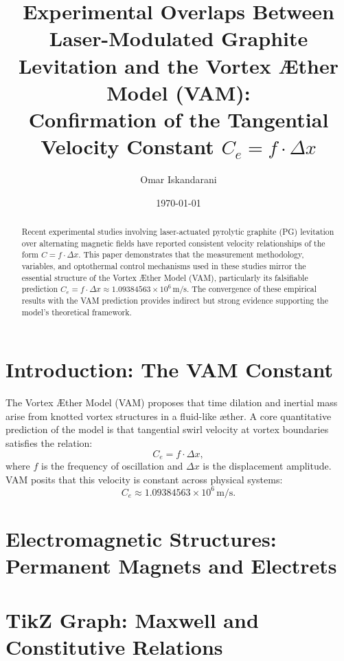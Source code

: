 \documentclass[11pt]{article}
\title{Experimental Overlaps Between Laser-Modulated Graphite Levitation and the Vortex Æther Model (VAM):\\
Confirmation of the Tangential Velocity Constant \( C_e = f \cdot \Delta x \)}
\author{Omar Iskandarani}
\date{\today}
\begin{document}
\maketitle

\begin{abstract}
Recent experimental studies involving laser-actuated pyrolytic graphite (PG) levitation over alternating magnetic fields have reported consistent velocity relationships of the form \( C = f \cdot \Delta x \). This paper demonstrates that the measurement methodology, variables, and optothermal control mechanisms used in these studies mirror the essential structure of the Vortex Æther Model (VAM), particularly its falsifiable prediction \( C_e = f \cdot \Delta x \approx 1.09384563 \times 10^6 \, \text{m/s} \). The convergence of these empirical results with the VAM prediction provides indirect but strong evidence supporting the model’s theoretical framework.
\end{abstract}


\section{Introduction: The VAM Constant}
The Vortex Æther Model (VAM) \cite{Iskandarani2025} proposes that time dilation and inertial mass arise from knotted vortex structures in a fluid-like æther. A core quantitative prediction of the model is that tangential swirl velocity at vortex boundaries satisfies the relation:
\[
C_e = f \cdot \Delta x,
\]
where \( f \) is the frequency of oscillation and \( \Delta x \) is the displacement amplitude. VAM posits that this velocity is constant across physical systems:
\[
C_e \approx 1.09384563 \times 10^6 \, \text{m/s}.
\]

\section{Electromagnetic Structures: Permanent Magnets and Electrets}

\section*{TikZ Graph: Maxwell and Constitutive Relations}
\end{document}
